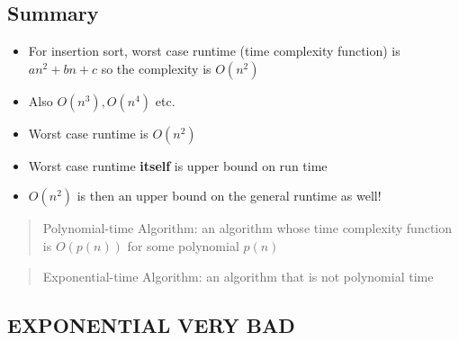 \documentclass[12pt, letter]{article}
\begin{document}
\subsection*{Summary}
\begin{itemize}
	\item For insertion sort, worst case runtime (time complexity function) is $an^2+bn+c$ so the complexity is $O(n^2)$ \\
	\item Also $O(n^{3}), O(n^{4})$ etc.
	\item Worst case runtime is $O(n^2)$
	\item Worst case runtime \textbf{itself} is upper bound on run time
	\item $O(n^2)$ is then an upper bound on the general runtime as well!
\end{itemize}

\begin{quote}
	Polynomial-time Algorithm: an algorithm whose time complexity function is $O(p(n))$ for some polynomial $p(n)$
\end{quote}

\begin{quote}
	Exponential-time Algorithm: an algorithm that is not polynomial time
\end{quote}

\subsection*{EXPONENTIAL VERY BAD}
\end{document}
